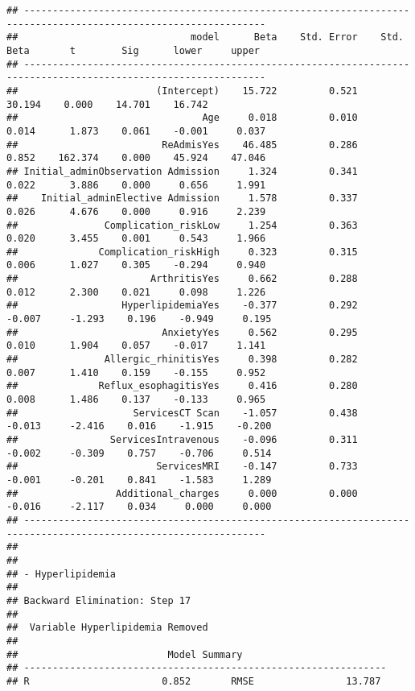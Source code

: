 \documentclass[
]{article}
\begin{document}
\begin{verbatim}
## ----------------------------------------------------------------------------------------------------------------
##                              model      Beta    Std. Error    Std. Beta       t        Sig      lower     upper 
## ----------------------------------------------------------------------------------------------------------------
##                        (Intercept)    15.722         0.521                  30.194    0.000    14.701    16.742 
##                                Age     0.018         0.010        0.014      1.873    0.061    -0.001     0.037 
##                         ReAdmisYes    46.485         0.286        0.852    162.374    0.000    45.924    47.046 
## Initial_adminObservation Admission     1.324         0.341        0.022      3.886    0.000     0.656     1.991 
##    Initial_adminElective Admission     1.578         0.337        0.026      4.676    0.000     0.916     2.239 
##               Complication_riskLow     1.254         0.363        0.020      3.455    0.001     0.543     1.966 
##              Complication_riskHigh     0.323         0.315        0.006      1.027    0.305    -0.294     0.940 
##                       ArthritisYes     0.662         0.288        0.012      2.300    0.021     0.098     1.226 
##                  HyperlipidemiaYes    -0.377         0.292       -0.007     -1.293    0.196    -0.949     0.195 
##                         AnxietyYes     0.562         0.295        0.010      1.904    0.057    -0.017     1.141 
##               Allergic_rhinitisYes     0.398         0.282        0.007      1.410    0.159    -0.155     0.952 
##              Reflux_esophagitisYes     0.416         0.280        0.008      1.486    0.137    -0.133     0.965 
##                    ServicesCT Scan    -1.057         0.438       -0.013     -2.416    0.016    -1.915    -0.200 
##                ServicesIntravenous    -0.096         0.311       -0.002     -0.309    0.757    -0.706     0.514 
##                        ServicesMRI    -0.147         0.733       -0.001     -0.201    0.841    -1.583     1.289 
##                 Additional_charges     0.000         0.000       -0.016     -2.117    0.034     0.000     0.000 
## ----------------------------------------------------------------------------------------------------------------
## 
## 
## - Hyperlipidemia 
## 
## Backward Elimination: Step 17 
## 
##  Variable Hyperlipidemia Removed 
## 
##                          Model Summary                          
## ---------------------------------------------------------------
## R                       0.852       RMSE                13.787 

\end{verbatim}
\end{document}
